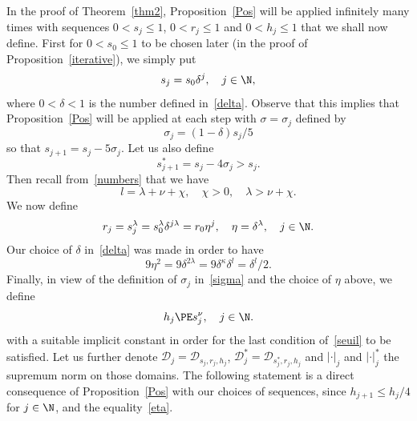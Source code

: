 In the proof of Theorem~\ref{thm2}, Proposition~\ref{Pos} will be applied infinitely many times with sequences $0 < s_j \leq 1$, $0 <r_j \leq 1$ and $0 < h_j \leq 1$ that we shall now define. First for $0<s_0\leq 1$ to be chosen later (in the proof of Proposition~\ref{iterative}), we simply put
\begin{equation}\label{sj}
s_j=s_0\delta^{j}, \quad j \in \N,
\end{equation}
where $0<\delta<1$ is the number defined in~\eqref{delta}. Observe that this implies that Proposition~\ref{Pos} will be applied at each step with $\sigma=\sigma_j$ defined by
\begin{equation}\label{sigma}
\sigma_j=(1-\delta)s_j/5
\end{equation}
so that $s_{j+1}=s_j-5\sigma_j$. Let us also define
\begin{equation}\label{sj+}
s_{j+1}^*=s_j-4\sigma_j>s_j.
\end{equation}
Then recall from~\eqref{numbers} that we have
\[ l=\lambda+\nu+\chi, \quad \chi>0, \quad \lambda>\nu+\chi. \]
We now define
\begin{equation}\label{rj}
r_j=s_j^\lambda=s_0^\lambda\delta^{j \lambda}=r_0\eta^{j}, \quad \eta=\delta^{\lambda}, \quad j \in \N.
\end{equation}
Our choice of $\delta$ in~\eqref{delta} was made in order to have
\begin{equation}\label{eta}
9\eta^2=9\delta^{2\lambda}=9\delta^{\kappa}\delta^l=\delta^l/2.
\end{equation}
Finally, in view of the definition of $\sigma_j$ in~\eqref{sigma} and the choice of $\eta$ above, we define
\begin{equation}\label{hj}
h_j\PE s_j^\nu, \quad j \in \N.
\end{equation}
with a suitable implicit constant in order for the last condition of~\eqref{seuil} to be satisfied. Let us further denote $\mathcal{D}_j=\mathcal{D}_{s_j,r_j,h_j}$, $\mathcal{D}_j^*=\mathcal{D}_{s_j^*,r_j,h_j}$ and $|{\cdot}|_j$ and $|{\cdot}|_j^*$ the supremum norm on those domains. The following statement is a direct consequence of Proposition~\ref{Pos} with our choices of sequences, since $h_{j+1}\leq h_j/4$ for $j \in \N$, and the equality~\eqref{eta}.

